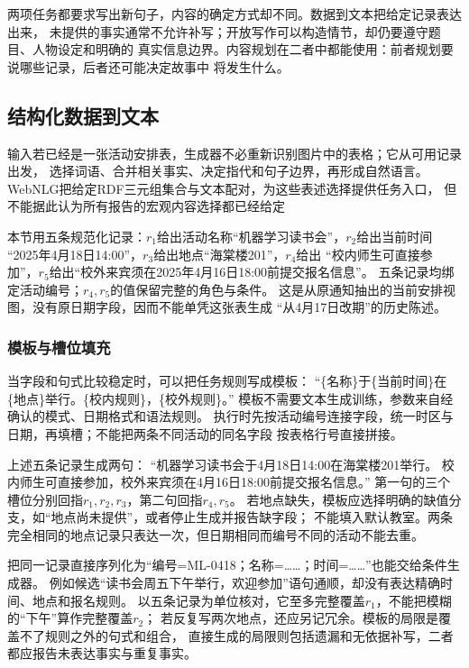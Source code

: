 两项任务都要求写出新句子，内容的确定方式却不同。数据到文本把给定记录表达出来，
未提供的事实通常不允许补写；开放写作可以构造情节，却仍要遵守题目、人物设定和明确的
真实信息边界。内容规划在二者中都能使用：前者规划要说哪些记录，后者还可能决定故事中
将发生什么。

\subsection{结构化数据到文本}
\label{sec:nlp-generation-data-to-text}

输入若已经是一张活动安排表，生成器不必重新识别图片中的表格；它从可用记录出发，
选择词语、合并相关事实、决定指代和句子边界，再形成自然语言。
WebNLG把给定RDF三元组集合与文本配对，为这些表述选择提供任务入口，
但不能据此认为所有报告的宏观内容选择都已经给定

本节用五条规范化记录：$r_1$给出活动名称“机器学习读书会”，$r_2$给出当前时间
“2025年4月18日14:00”，$r_3$给出地点“海棠楼201”，$r_4$给出
“校内师生可直接参加”，$r_5$给出“校外来宾须在2025年4月16日18:00前提交报名信息”。
五条记录均绑定活动编号；$r_4,r_5$的值保留完整的角色与条件。
这是从原通知抽出的当前安排视图，没有原日期字段，因而不能单凭这张表生成
“从4月17日改期”的历史陈述。

\subsubsection{模板与槽位填充}
\label{sec:nlp-generation-template}

当字段和句式比较稳定时，可以把任务规则写成模板：
“\{名称\}于\{当前时间\}在\{地点\}举行。\{校内规则\}，\{校外规则\}。”
模板不需要文本生成训练，参数来自经确认的模式、日期格式和语法规则。
执行时先按活动编号连接字段，统一时区与日期，再填槽；不能把两条不同活动的同名字段
按表格行号直接拼接。

上述五条记录生成两句：
“机器学习读书会于4月18日14:00在海棠楼201举行。
校内师生可直接参加，校外来宾须在4月16日18:00前提交报名信息。”
第一句的三个槽位分别回指$r_1,r_2,r_3$，第二句回指$r_4,r_5$。
若地点缺失，模板应选择明确的缺值分支，如“地点尚未提供”，或者停止生成并报告缺字段；
不能填入默认教室。两条完全相同的地点记录只表达一次，但日期相同而编号不同的活动不能去重。

把同一记录直接序列化为“编号=ML-0418；名称=……；时间=……”也能交给条件生成器。
例如候选“读书会周五下午举行，欢迎参加”语句通顺，却没有表达精确时间、地点和报名规则。
以五条记录为单位核对，它至多完整覆盖$r_1$，不能把模糊的“下午”算作完整覆盖$r_2$；
若反复写两次地点，还应另记冗余。模板的局限是覆盖不了规则之外的句式和组合，
直接生成的局限则包括遗漏和无依据补写，二者都应报告未表达事实与重复事实。

